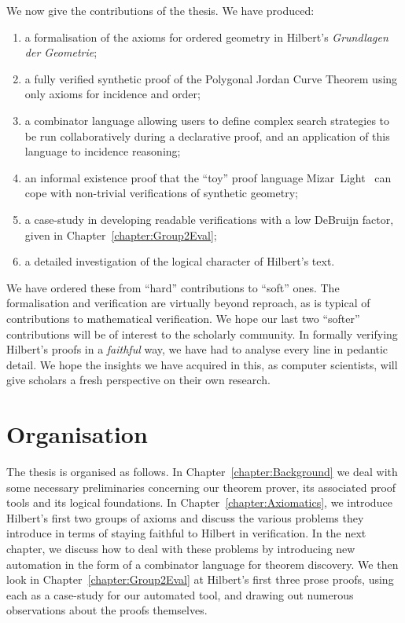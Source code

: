 We now give the contributions of the thesis. We have produced:
\begin{enumerate}
\item a formalisation of the axioms for ordered geometry in Hilbert's \emph{Grundlagen der Geometrie};
\item a fully verified synthetic proof of the Polygonal Jordan Curve Theorem using only axioms for incidence and order;
\item a combinator language allowing users to define complex search strategies to be run collaboratively during a declarative proof, and an application of this language to incidence reasoning;
\item an informal existence proof that the ``toy'' proof language Mizar~Light~\cite{MizarLight} can cope with non-trivial verifications of synthetic geometry;
\item a case-study in developing readable verifications with a low DeBruijn factor, given in Chapter~\ref{chapter:Group2Eval};
\item a detailed investigation of the logical character of Hilbert's text.
\end{enumerate}

We have ordered these from ``hard'' contributions to ``soft'' ones. The formalisation and verification are virtually beyond reproach, as is typical of contributions to mathematical verification. 
We hope our last two ``softer'' contributions will be of interest to the scholarly community. In formally verifying Hilbert's proofs in a \emph{faithful} way, we have had to analyse every line in pedantic detail. We hope the insights we have acquired in this, as computer scientists, will give scholars a fresh perspective on their own research.

\section{Organisation}
The thesis is organised as follows. In Chapter~\ref{chapter:Background} we deal with some necessary preliminaries concerning our theorem prover, its associated proof tools and its logical foundations. In Chapter~\ref{chapter:Axiomatics}, we introduce Hilbert's first two groups of axioms and discuss the various problems they introduce in terms of staying faithful to Hilbert in verification. In the next chapter, we discuss how to deal with these problems by introducing new automation in the form of a combinator language for theorem discovery. We then look in Chapter~\ref{chapter:Group2Eval} at Hilbert's first three prose proofs, using each as a case-study for our automated tool, and drawing out numerous observations about the proofs themselves.

